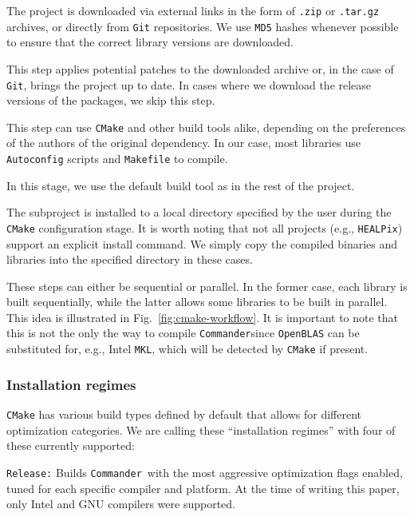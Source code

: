 \documentclass[twocolumn]{aa}
\def\commander{\texttt{Commander}}
\begin{document}
 The project is downloaded via external links in the form of \texttt{.zip} or \texttt{.tar.gz} archives, or directly from \texttt{Git} repositories. We use \texttt{MD5} hashes whenever possible to ensure that the correct library versions are downloaded.

 This step applies potential patches to the downloaded archive or, in the case of \texttt{Git}, brings the project up to date. In cases where we download the release versions of the packages, we skip this step.

 This step can use \texttt{CMake} and other build tools alike, depending on the preferences of the authors of the original dependency. In our case, most libraries use \texttt{Autoconfig} scripts and \texttt{Makefile} to compile.

 In this stage, we use the default build tool as in the rest of the project.

 The subproject is installed to a local directory specified by the user during the \texttt{CMake} configuration stage. It is worth noting that not all projects (e.g., \texttt{HEALPix}) support an explicit install command. We simply copy the compiled binaries and libraries into the specified directory in these cases.

These steps can either be sequential or parallel. In the former case,  each library is built sequentially, while the latter allows some libraries to be built in parallel. This idea is illustrated in  Fig.~\ref{fig:cmake-workflow}. It is important to note that this is not the only the way to compile \commander since \texttt{OpenBLAS}  can be substituted for, e.g., Intel \texttt{MKL}, which will be detected by \texttt{CMake} if present. 

\subsubsection{Installation regimes}
\label{cmake-installation-regimes}

\texttt{CMake} has various build types defined by default that allows for different optimization categories. We are calling these ``installation regimes'' with four of these currently supported:

\texttt{Release:} Builds \commander\ with the most aggressive optimization flags enabled, tuned for each specific compiler and platform. At the time of writing this paper, only Intel and GNU compilers were supported.
\end{document}
